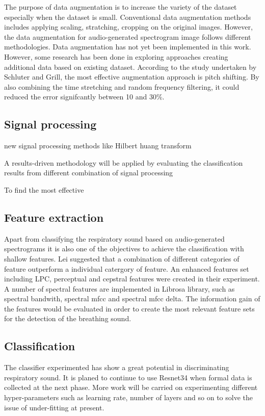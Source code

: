 The purpose of data augmentation is to increase the variety of the dataset especially when the dataset is small. Conventional data augmentation methods includes applying scaling, stratching, cropping on the original images. However, the data augmentation for audio-generated spectrogram image follows different methodologies. Data augmentation has not yet been implemented in this work. However, some research has been done in exploring approaches creating additional data based on existing dataset.\cite{Cho2017DeepBreathSettings} \cite{Schluter2015ExploringNetworks} According to the study undertaken by Schluter and Grill, the most effective augmentation approach is pitch shifting. By also combining the time stretching and random frequency filtering, it could reduced the error signifcantly between 10 and 30\%.\cite{Schluter2015ExploringNetworks}

\subsection{Signal processing}
new signal processing methods like Hilbert huang transform

A results-driven methodology will be applied by evaluating the classification results from different combination of signal processing 

To find the most effective 

\subsection{Feature extraction}
Apart from classifying the respiratory sound based on audio-generated spectrograms it is also one of the objectives to achieve the classification with shallow features. Lei suggested that a combination of different categories of feature outperform a individual catergory of feature.\cite{Lei2014Content-basedFeatures} An enhanced features set including LPC, perceptual and cepstral features were created in their experiment. A number of spectral features are implemented in Librosa library, such as spectral bandwith, spectral mfcc and spectral mfcc delta. The information gain of the features would be evaluated in order to create the most relevant feature sets for the detection of the breathing sound.

\subsection{Classification}
The classifier experimented has show a great potential in discriminating respiratory sound. It is planed to continue to use Resnet34 when formal data is collected at the next phase. More work will be carried on experimenting different hyper-parameters such as learning rate, number of layers and so on to solve the issue of under-fitting at present.

